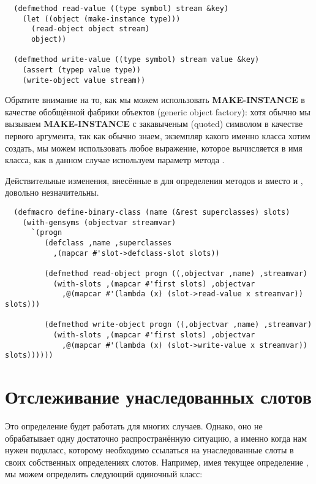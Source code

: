 \begin{lstlisting}
  (defmethod read-value ((type symbol) stream &key)
    (let ((object (make-instance type)))
      (read-object object stream)
      object))

  (defmethod write-value ((type symbol) stream value &key)
    (assert (typep value type))
    (write-object value stream))
\end{lstlisting}

Обратите внимание на то, как мы можем использовать \textbf{MAKE-INSTANCE} в качестве
обобщённой фабрики объектов (generic object factory): хотя обычно мы вызываем
\textbf{MAKE-INSTANCE} с закавыченым (quoted) символом в качестве первого аргумента, так
как обычно знаем, экземпляр какого именно класса хотим создать, мы можем использовать
любое выражение, которое вычисляется в имя класса, как в данном случае используем параметр
 метода .

Действительные изменения, внесённые в  для определения методов
 и  вместо  и ,
довольно незначительны.

\begin{lstlisting}
  (defmacro define-binary-class (name (&rest superclasses) slots)
    (with-gensyms (objectvar streamvar)
      `(progn
         (defclass ,name ,superclasses
           ,(mapcar #'slot->defclass-slot slots))

         (defmethod read-object progn ((,objectvar ,name) ,streamvar)
           (with-slots ,(mapcar #'first slots) ,objectvar
             ,@(mapcar #'(lambda (x) (slot->read-value x streamvar)) slots)))

         (defmethod write-object progn ((,objectvar ,name) ,streamvar)
           (with-slots ,(mapcar #'first slots) ,objectvar
             ,@(mapcar #'(lambda (x) (slot->write-value x streamvar)) slots))))))
\end{lstlisting}

\section{Отслеживание унаследованных слотов}

Это определение будет работать для многих случаев. Однако, оно не обрабатывает одну
достаточно распространённую ситуацию, а именно когда нам нужен подкласс, которому
необходимо ссылаться на унаследованные слоты в своих собственных определениях
слотов. Например, имея текущее определение , мы можем определить
следующий одиночный класс:

